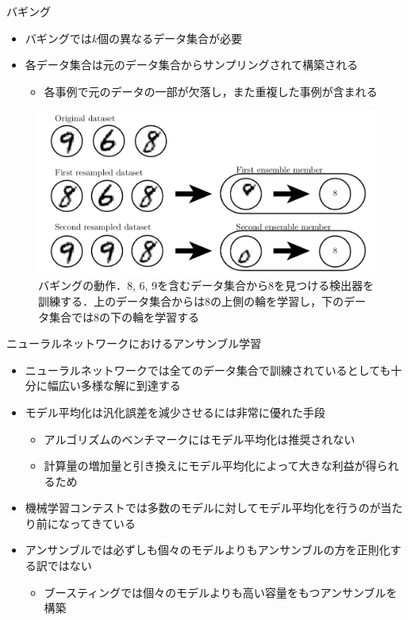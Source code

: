 \documentclass[dvipdfmx, 10pt]{beamer}
\begin{document}

\begin{frame}{バギング}
  \begin{itemize}
    \item バギングでは$k$個の異なるデータ集合が必要
    \item 各データ集合は元のデータ集合からサンプリングされて構築される
      \begin{itemize}
        \item 各事例で元のデータの一部が欠落し，また重複した事例が含まれる
      \end{itemize}
  \end{itemize}
  \begin{figure}[htbp]
    \centering
    \includegraphics[keepaspectratio, scale=0.30]{./images/bagging.png}
    \caption{バギングの動作．8, 6, 9を含むデータ集合から8を見つける検出器を訓練する．上のデータ集合からは8の上側の輪を学習し，下のデータ集合では8の下の輪を学習する}
  \end{figure}
\end{frame}


\begin{frame}{ニューラルネットワークにおけるアンサンブル学習}
  \begin{itemize}
    \item ニューラルネットワークでは全てのデータ集合で訓練されているとしても十分に幅広い多様な解に到達する
    \item モデル平均化は汎化誤差を減少させるには非常に優れた手段
    \begin{itemize}
      \item アルゴリズムのベンチマークにはモデル平均化は推奨されない
      \item 計算量の増加量と引き換えにモデル平均化によって大きな利益が得られるため
    \end{itemize}
    \item 機械学習コンテストでは多数のモデルに対してモデル平均化を行うのが当たり前になってきている
    \item アンサンブルでは必ずしも個々のモデルよりもアンサンブルの方を正則化する訳ではない
    \begin{itemize}
      \item \alert{ブースティング}では個々のモデルよりも高い容量をもつアンサンブルを構築
    \end{itemize}
  \end{itemize}
\end{frame}
\end{document}
